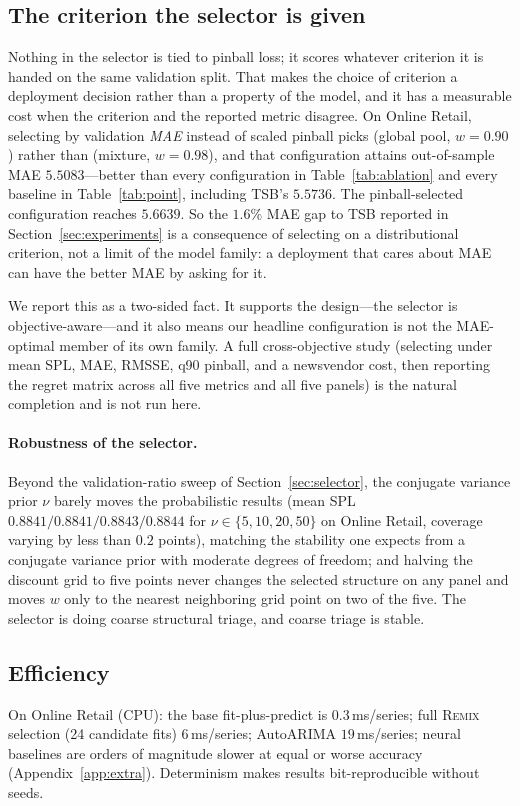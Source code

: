 \documentclass[twocolumn,10pt]{article}
\newcommand{\REMIX}{\textsc{Remix}}
\begin{document}
\subsection{The criterion the selector is given}\label{sec:criterion}
Nothing in the selector is tied to pinball loss; it scores whatever
criterion it is handed on the same validation split. That makes the
choice of criterion a deployment decision rather than a property of the
model, and it has a measurable cost when the criterion and the reported
metric disagree. On Online Retail, selecting by validation \emph{MAE}
instead of scaled pinball picks (global pool, $w{=}0.90$) rather than
(mixture, $w{=}0.98$), and that configuration attains out-of-sample MAE
$5.5083$---better than every configuration in
Table~\ref{tab:ablation} and every baseline in Table~\ref{tab:point},
including TSB's $5.5736$. The pinball-selected configuration reaches
$5.6639$. So the $1.6\%$ MAE gap to TSB reported in
Section~\ref{sec:experiments} is a consequence of selecting on a
distributional criterion, not a limit of the model family: a deployment
that cares about MAE can have the better MAE by asking for it.

We report this as a two-sided fact. It supports the design---the selector
is objective-aware---and it also means our headline configuration is not
the MAE-optimal member of its own family. A full cross-objective study
(selecting under mean SPL, MAE, RMSSE, q90 pinball, and a newsvendor cost,
then reporting the regret matrix across all five metrics and all five
panels) is the natural completion and is not run here.

\paragraph{Robustness of the selector.} Beyond the validation-ratio
sweep of Section~\ref{sec:selector}, the conjugate variance prior
$\nu$ barely moves the probabilistic results
(mean SPL $0.8841/0.8841/0.8843/0.8844$ for $\nu\in\{5,10,20,50\}$ on
Online Retail, coverage varying by less than $0.2$ points), matching the
stability one expects from a conjugate variance prior with moderate
degrees of freedom; and halving the discount grid to five points never changes the
selected structure on any panel and moves $w$ only to the nearest
neighboring grid point on two of the five. The selector is doing coarse
structural triage, and coarse triage is stable.

\subsection{Efficiency}\label{sec:efficiency}
On Online Retail (CPU): the base fit-plus-predict is $0.3$\,ms/series;
full \REMIX{} selection (24 candidate fits) $6$\,ms/series; AutoARIMA
$19$\,ms/series; neural baselines are orders of magnitude slower at equal
or worse accuracy (Appendix~\ref{app:extra}). Determinism makes results
bit-reproducible without seeds.
\end{document}

